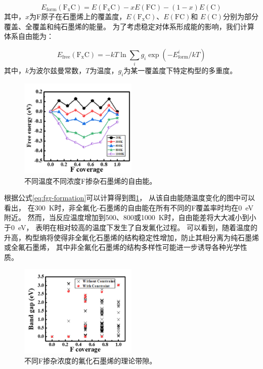 \begin{equation}\label{eq:fgr-formation}
  E_{\mathrm{form}}(\mathrm{F_x C}) =
    E(\mathrm{F_x C}) - x E(\mathrm{FC}) - (1-x)E(\mathrm{C})
\end{equation}
其中，$x$为F原子在石墨烯上的覆盖度，$E(\mathrm{F_x C})$、$E(\mathrm{FC})$和
$E(\mathrm{C})$分别为部分覆盖、全覆盖和纯石墨烯的能量。
为了考虑稳定对体系形成能的影响，我们计算体系自由能为：

\begin{equation}\label{eq:fgr-free}
  E_{\mathrm{free}}(\mathrm{F_x C}) = -kT \ln \sum_i g_i \exp (-E_{\mathrm{form}}^i / kT)
\end{equation}
其中，$k$为波尔兹曼常数，$T$为温度，$g_i$为某一覆盖度下特定构型的多重度。

\begin{figure}[htb]
  \includegraphics[width=0.5\textwidth]{figs/fgr-a.png}
  \centering
  \caption{不同温度不同浓度F掺杂石墨烯的自由能。}
  \label{fig:fgr-a}
\end{figure}

根据公式\ref{eq:fgr-formation}可以计算得到图\ref{fig:fgr-a}，
从该自由能随温度变化的图中可以看出，
在\SI{300}{\kelvin}时，非全氟化-石墨烯的自由能在所有不同的F覆盖率时均在\SI{0}{\eV}附近。
然而，当反应温度增加到\num{500}、\num{800}或\SI{1000}{\kelvin}时，自由能差将大大减小到小于\SI{0}{\eV}，
表明在相对较高的温度下发生了自发氟化过程。
可以看到，随着温度的升高，构型熵将使得非全氟化石墨烯的结构稳定性增加，防止其相分离为纯石墨烯或全氟石墨烯，
其中非全氟化石墨烯的结构多样性可能进一步诱导各种光学性质。

\begin{figure}[htb]
  \includegraphics[width=0.5\textwidth]{figs/fgr-b.png}
  \centering
  \caption{不同F掺杂浓度的氟化石墨烯的理论带隙。}
  \label{fig:fgr-b}
\end{figure}

